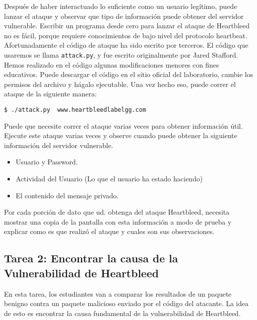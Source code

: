 Después de haber interactuado lo suficiente como un usuario legítimo, puede lanzar el ataque y observar que tipo de información puede obtener del servidor vulnerable.
Escribir un programa desde cero para lanzar el ataque de Heartbleed no es fácil, porque requiere conocimientos de bajo nivel del protocolo heartbeat. Afortunadamente el código de ataque ha sido escrito por terceros.
El código que usaremos se llama \texttt{attack.py}, y fue escrito originalmente por Jared Stafford.
Hemos realizado en el código algunas modificaciones menores con fines educativos.
Puede descargar el código en el sitio oficial del laboratorio, cambie los permisos del archivo y hágalo ejecutable. Una vez hecho eso, puede correr el ataque de la siguiente manera:

\begin{lstlisting}
$ ./attack.py  www.heartbleedlabelgg.com
\end{lstlisting}

Puede que necesite correr el ataque varias veces para obtener información útil.
Ejecute este ataque varias veces y observe cuando puede obtener la siguiente información del servidor vulnerable.
 

\begin{itemize} 
	\item Usuario y Password.
	\item Actividad del Usuario (Lo que el usuario ha estado haciendo)
	\item El contenido del mensaje privado.
\end{itemize} 
  
Por cada porción de dato que ud. obtenga del ataque Heartbleed, necesita mostrar una copia de la pantalla con esta información a modo de prueba y explicar como es que realizó el ataque y cuales son sus observaciones.



\subsection{Tarea 2: Encontrar la causa de la Vulnerabilidad de Heartbleed}

En esta tarea, los estudiantes van a comparar los resultados de un paquete benigno contra un paquete malicioso enviado por el código del atacante. La idea de esto es encontrar la causa fundamental de la vulnerabilidad de Heartbleed.

